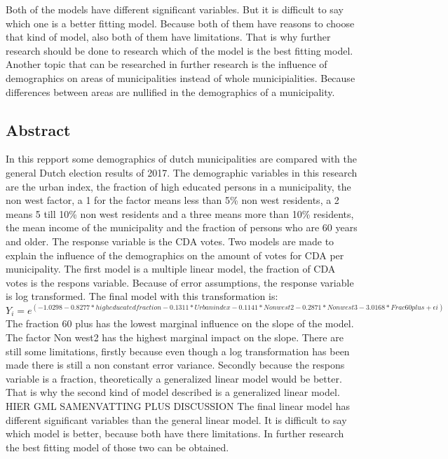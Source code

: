 \documentclass[11pt,]{article}
\begin{document}
Both of the models have different significant variables. But it is
difficult to say which one is a better fitting model. Because both of
them have reasons to choose that kind of model, also both of them have
limitations. That is why further research should be done to research
which of the model is the best fitting model. Another topic that can be
researched in further research is the influence of demographics on areas
of municipalities instead of whole municipialities. Because differences
between areas are nullified in the demographics of a municipality.

\subsection{Abstract}\label{abstract}

In this repport some demographics of dutch municipalities are compared
with the general Dutch election results of 2017. The demographic
variables in this research are the urban index, the fraction of high
educated persons in a municipality, the non west factor, a 1 for the
factor means less than 5\% non west residents, a 2 means 5 till 10\% non
west residents and a three means more than 10\% residents, the mean
income of the municipality and the fraction of persons who are 60 years
and older. The response variable is the CDA votes. Two models are made
to explain the influence of the demographics on the amount of votes for
CDA per municipality. The first model is a multiple linear model, the
fraction of CDA votes is the respons variable. Because of error
assumptions, the response variable is log transformed. The final model
with this transformation is:\\
\(Y_i = e^(-1.0298 -0.8277*high educated fraction -0.1311*Urban index -0.1141*Non west2 -0.2871*Non west3 -3.0168*Frac 60plus + \epsilon i)\)\\
The fraction 60 plus has the lowest marginal influence on the slope of
the model. The factor Non west2 has the highest marginal impact on the
slope. There are still some limitations, firstly because even though a
log transformation has been made there is still a non constant error
variance. Secondly because the respons variable is a fraction,
theoretically a generalized linear model would be better. That is why
the second kind of model described is a generalized linear model. HIER
GML SAMENVATTING PLUS DISCUSSION The final linear model has different
significant variables than the general linear model. It is difficult to
say which model is better, because both have there limitations. In
further research the best fitting model of those two can be obtained.
\end{document}
